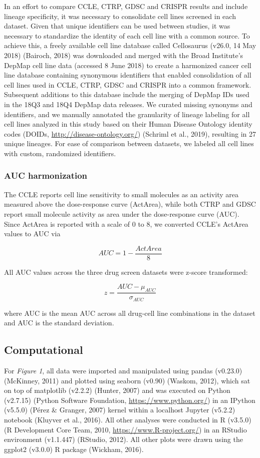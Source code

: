 \documentclass[man]{apa6}
\begin{document}
In an effort to compare CCLE, CTRP, GDSC and CRISPR results and include
lineage specificity, it was necessary to consolidate cell lines screened
in each dataset. Given that unique identifiers can be used between
studies, it was necessary to standardize the identity of each cell line
with a common source. To achieve this, a freely available cell line
database called Cellosaurus (v26.0, 14 May 2018) (Bairoch, 2018) was
downloaded and merged with the Broad Institute's DepMap cell line data
(accessed 8 June 2018) to create a harmonized cancer cell line database
containing synonymous identifiers that enabled consolidation of all cell
lines used in CCLE, CTRP, GDSC and CRISPR into a common framework.
Subsequent additions to this database include the merging of DepMap IDs
used in the 18Q3 and 18Q4 DepMap data releases. We curated missing
synonyms and identifiers, and we manually annotated the granularity of
lineage labeling for all cell lines analyzed in this study based on
their Human Disease Ontology identity codes (DOIDs,
\url{http://disease-ontology.org/}) (Schriml et al., 2019), resulting in
27 unique lineages. For ease of comparison between datasets, we labeled
all cell lines with custom, randomized identifiers.

\subsubsection{AUC harmonization}\label{auc-harmonization}

The CCLE reports cell line sensitivity to small molecules as an activity
area measured above the dose-response curve (ActArea), while both CTRP
and GDSC report small molecule activity as area under the dose-response
curve (AUC). Since ActArea is reported with a scale of 0 to 8, we
converted CCLE's ActArea values to AUC via

\[AUC=1- \frac{ActArea}{8}\]

All AUC values across the three drug screen datasets were z-score
transformed:

\[z = \frac{AUC - \mu_{AUC}}{\sigma_{AUC}}\]

where AUC is the mean AUC across all drug-cell line combinations in the
dataset and AUC is the standard deviation.

\subsection{Computational}\label{computational}

For \emph{Figure 1}, all data were imported and manipulated using pandas
(v0.23.0) (McKinney, 2011) and plotted using seaborn (v0.90) (Waskom,
2012), which sat on top of matplotlib (v2.2.2) (Hunter, 2007) and was
executed on Python (v2.7.15) (Python Software Foundation,
\url{https://www.python.org/}) in an IPython (v5.5.0) (Pérez \& Granger,
2007) kernel within a localhost Jupyter (v5.2.2) notebook (Kluyver et
al., 2016). All other analyses were conducted in R (v3.5.0) (R
Development Core Team, 2010, \url{https://www.R-project.org/}) in an
RStudio environment (v1.1.447) (RStudio, 2012). All other plots were
drawn using the ggplot2 (v3.0.0) R package (Wickham, 2016).
\end{document}
